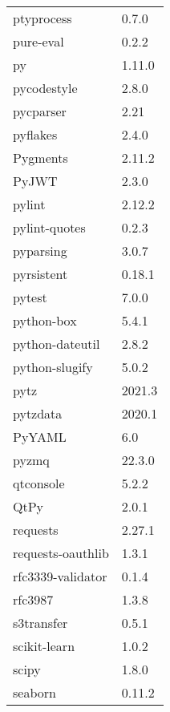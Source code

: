 \begin{table}[h]
\begin{tabular}{|l|l|}
    ptyprocess                   & 0.7.0     \\
    pure-eval                    & 0.2.2     \\
    py                           & 1.11.0    \\
    pycodestyle                  & 2.8.0     \\
    pycparser                    & 2.21      \\
    pyflakes                     & 2.4.0     \\
    Pygments                     & 2.11.2    \\
    PyJWT                        & 2.3.0     \\
    pylint                       & 2.12.2    \\
    pylint-quotes                & 0.2.3     \\
    pyparsing                    & 3.0.7     \\
    pyrsistent                   & 0.18.1    \\
    pytest                       & 7.0.0     \\
    python-box                   & 5.4.1     \\
    python-dateutil              & 2.8.2     \\
    python-slugify               & 5.0.2     \\
    pytz                         & 2021.3    \\
    pytzdata                     & 2020.1    \\
    PyYAML                       & 6.0       \\
    pyzmq                        & 22.3.0    \\
    qtconsole                    & 5.2.2     \\
    QtPy                         & 2.0.1     \\
    requests                     & 2.27.1    \\
    requests-oauthlib            & 1.3.1     \\
    rfc3339-validator            & 0.1.4     \\
    rfc3987                      & 1.3.8     \\
    s3transfer                   & 0.5.1     \\
    scikit-learn                 & 1.0.2     \\
    scipy                        & 1.8.0     \\
    seaborn                      & 0.11.2    \\

\end{tabular}
\end{table}

